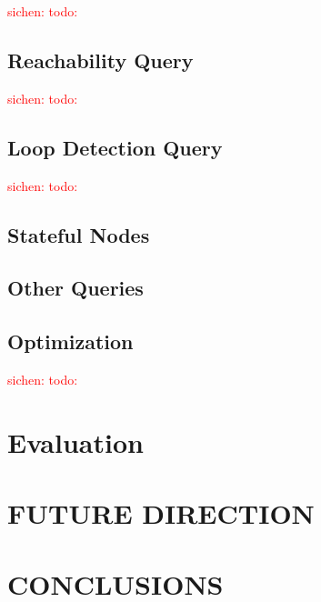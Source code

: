 \documentclass[letterpaper, 10 pt, conference]{ieeeconf}  %
\newcommand\sichen[1]{\textcolor{red}{sichen: #1}}
\begin{document}
\sichen{todo:}

\subsection{Reachability Query}
\sichen{todo:}

\subsection{Loop Detection Query}
\sichen{todo:}
\subsection{Stateful Nodes}

\subsection{Other Queries}

\subsection{Optimization}\label{sec:opt}
\sichen{todo:}

\section{Evaluation}\label{sec:eval}

\section{FUTURE DIRECTION}\label{sec:fd}

\section{CONCLUSIONS}\label{sec:c}




\addtolength{\textheight}{-12cm}  


\end{document}
